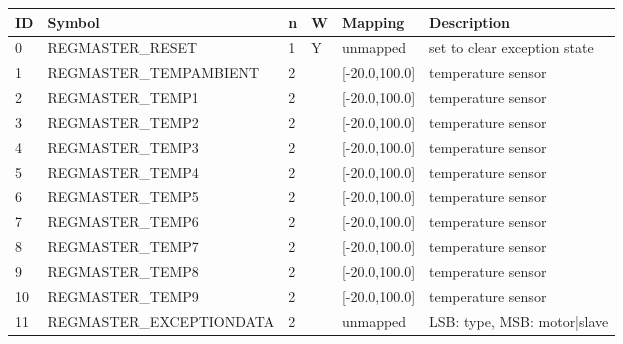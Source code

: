 \begin{tabular}{|p{0.2in}|p{2.7in}|p{0.1in}|p{0.1in}|p{1in}|p{1.5in}|}\hline
\textbf{ID} & \textbf{Symbol} & \textbf{n} & \textbf{W} & \textbf{Mapping} & \textbf{Description}  \\ \hline 
0 & REGMASTER\_RESET & 1 & Y & unmapped & set to clear exception state\\ \hline
1 & REGMASTER\_TEMPAMBIENT & 2 &  & [-20.0,100.0] & temperature sensor\\ \hline
2 & REGMASTER\_TEMP1 & 2 &  & [-20.0,100.0] & temperature sensor\\ \hline
3 & REGMASTER\_TEMP2 & 2 &  & [-20.0,100.0] & temperature sensor\\ \hline
4 & REGMASTER\_TEMP3 & 2 &  & [-20.0,100.0] & temperature sensor\\ \hline
5 & REGMASTER\_TEMP4 & 2 &  & [-20.0,100.0] & temperature sensor\\ \hline
6 & REGMASTER\_TEMP5 & 2 &  & [-20.0,100.0] & temperature sensor\\ \hline
7 & REGMASTER\_TEMP6 & 2 &  & [-20.0,100.0] & temperature sensor\\ \hline
8 & REGMASTER\_TEMP7 & 2 &  & [-20.0,100.0] & temperature sensor\\ \hline
9 & REGMASTER\_TEMP8 & 2 &  & [-20.0,100.0] & temperature sensor\\ \hline
10 & REGMASTER\_TEMP9 & 2 &  & [-20.0,100.0] & temperature sensor\\ \hline
11 & REGMASTER\_EXCEPTIONDATA & 2 &  & unmapped & LSB: type, MSB: motor|slave\\ \hline
\end{tabular}


